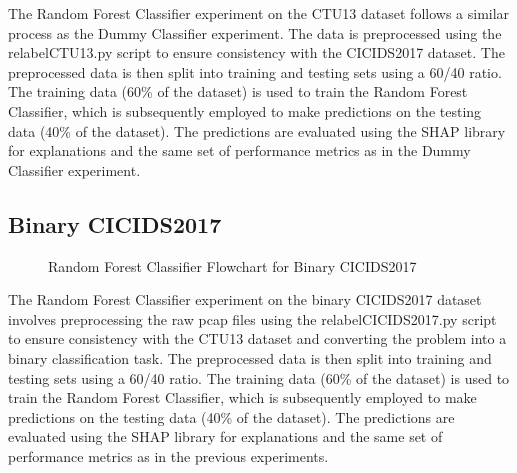 The Random Forest Classifier experiment on the CTU13 dataset follows a similar process as the Dummy Classifier experiment. The data is preprocessed using the relabelCTU13.py script to ensure consistency with the CICIDS2017 dataset. The preprocessed data is then split into training and testing sets using a 60/40 ratio. The training data (60\% of the dataset) is used to train the Random Forest Classifier, which is subsequently employed to make predictions on the testing data (40\% of the dataset). The predictions are evaluated using the SHAP library for explanations and the same set of performance metrics as in the Dummy Classifier experiment.

\subsection{Binary CICIDS2017}
\begin{figure}[H]
\centering
{}
\caption{Random Forest Classifier Flowchart for Binary CICIDS2017}\label{fig:RandomForestFlowBinaryCICIDS2017}
\end{figure}

The Random Forest Classifier experiment on the binary CICIDS2017 dataset involves preprocessing the raw pcap files using the relabelCICIDS2017.py script to ensure consistency with the CTU13 dataset and converting the problem into a binary classification task. The preprocessed data is then split into training and testing sets using a 60/40 ratio. The training data (60\% of the dataset) is used to train the Random Forest Classifier, which is subsequently employed to make predictions on the testing data (40\% of the dataset). The predictions are evaluated using the SHAP library for explanations and the same set of performance metrics as in the previous experiments.

